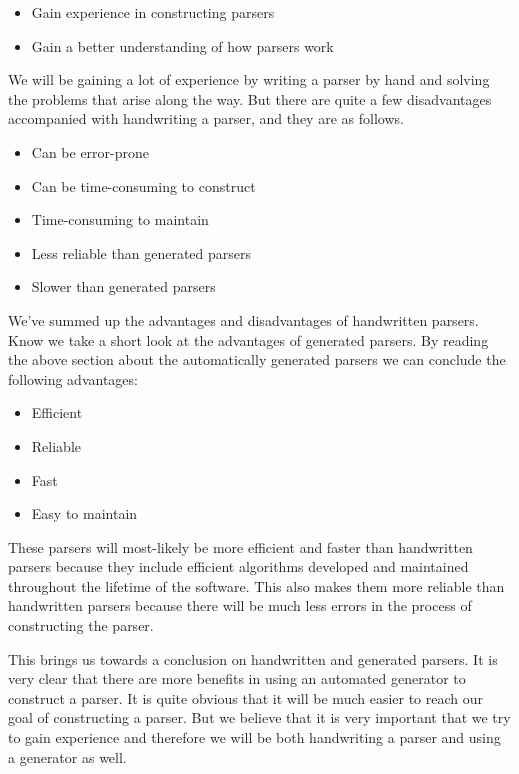 \begin{itemize}[noitemsep]
\item Gain experience in constructing parsers
\item Gain a better understanding of how parsers work
\end{itemize}

We will be gaining a lot of experience by writing a parser by hand and solving the problems that arise along the way. But there are quite a few disadvantages accompanied with handwriting a parser, and they are as follows.

\begin{itemize}[noitemsep]
\item Can be error-prone
\item Can be time-consuming to construct
\item Time-consuming to maintain
\item Less reliable than generated parsers
\item Slower than generated parsers
\end{itemize}

We've summed up the advantages and disadvantages of handwritten parsers. Know we take a short look at the advantages of generated parsers. By reading the above section about the automatically generated parsers we can conclude the following advantages:

\begin{itemize}[noitemsep]
\item Efficient
\item Reliable
\item Fast
\item Easy to maintain
\end{itemize}

These parsers will most-likely be more efficient and faster than handwritten parsers because they include efficient algorithms developed and maintained throughout the lifetime of the software. This also makes them more reliable than handwritten parsers because there will be much less errors in the process of constructing the parser.

This brings us towards a conclusion on handwritten and generated parsers. It is very clear that there are more benefits in using an automated generator to construct a parser. It is quite obvious that it will be much easier to reach our goal of constructing a parser. But we believe that it is very important that we try to gain experience and therefore we will be both handwriting a parser and using a generator as well.